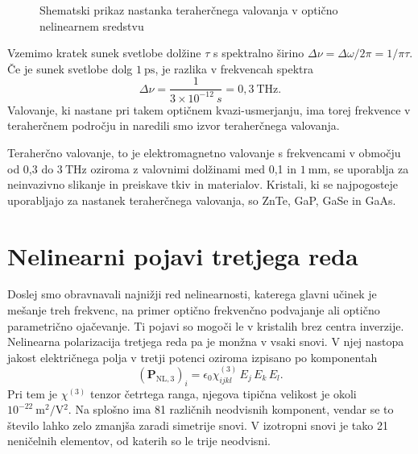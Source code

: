 \begin{figure}[h]
\centering
\def\svgwidth{110truemm} 

\caption{Shematski prikaz nastanka teraherčnega valovanja v optično nelinearnem sredstvu}
\label{fig:THz}
\end{figure}

Vzemimo kratek sunek svetlobe dolžine $\tau$ s spektralno širino
$\Delta \nu = \Delta \omega/2 \pi = 1/\pi \tau$.
Če je sunek svetlobe dolg $1~\si{\pico\second}$, je razlika v frekvencah 
spektra 
\begin{equation}
\Delta \nu = \frac{1}{3 \times 10^{-12}~\si{s}} = 0,3~\si{\tera\hertz}.
\end{equation}
Valovanje, ki nastane pri takem optičnem kvazi-usmerjanju, ima torej frekvence v teraherčnem
področju in naredili smo izvor teraherčnega valovanja. 

Teraherčno valovanje, to je 
elektromagnetno valovanje s frekvencami v območju od 0,3 do $3~\si{\tera\hertz}$
oziroma z valovnimi dolžinami med 0,1 in $1~\si{\milli\metre}$, 
se uporablja za neinvazivno slikanje in preiskave tkiv in materialov. Kristali, ki 
se najpogosteje uporabljajo za nastanek teraherčnega valovanja, so ZnTe, 
GaP, GaSe in GaAs.  

\section{Nelinearni pojavi tretjega reda}
Doslej smo obravnavali najnižji red nelinearnosti, katerega glavni
učinek je mešanje treh frekvenc, na primer optično frekvenčno podvajanje ali
optično parametrično ojačevanje. Ti pojavi so mogoči le v kristalih brez centra
inverzije. Nelinearna polarizacija tretjega reda pa je monžna v vsaki snovi. 
V njej nastopa jakost električnega polja v tretji potenci
oziroma izpisano po komponentah
\begin{equation}
\left(\mathbf{P}_{\mathrm{NL,3}}\right)_i= \epsilon_{0}\chi^{(3)}_{ijkl} \,E_j \,E_k\, E_l.
\end{equation}
Pri tem je $\chi^{(3)}$ tenzor četrtega ranga, njegova tipična velikost je okoli 
$10^{-22}~\si{\metre^2/\volt^2}$. Na splošno ima 81 različnih neodvisnih komponent, vendar se to
število lahko zelo zmanjša zaradi simetrije snovi. V izotropni snovi je tako
21 neničelnih elementov, od katerih so le trije neodvisni. 

